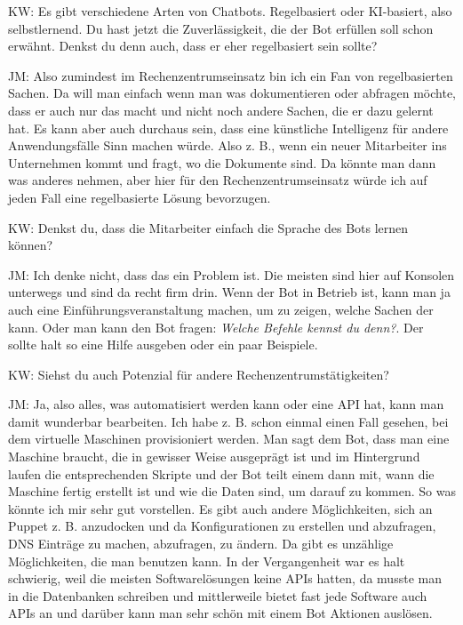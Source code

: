 \begin{list}{X:}{\setlength{\labelsep}{5mm}}
\item[KW:] Es gibt verschiedene Arten von Chatbots. Regelbasiert oder KI-basiert, also selbstlernend. Du hast jetzt die Zuverlässigkeit, die der Bot erfüllen soll schon erwähnt. Denkst du denn auch, dass er eher regelbasiert sein sollte?
\item[JM:] Also zumindest im Rechenzentrumseinsatz bin ich ein Fan von regelbasierten Sachen. Da will man einfach wenn man was dokumentieren oder abfragen möchte, dass er auch nur das macht und nicht noch andere Sachen, die er dazu gelernt hat. Es kann aber auch durchaus sein, dass eine künstliche Intelligenz für andere Anwendungsfälle Sinn machen würde. Also z. B., wenn ein neuer Mitarbeiter ins Unternehmen kommt und fragt, wo die Dokumente sind. Da könnte man dann was anderes nehmen, aber hier für den Rechenzentrumseinsatz würde ich auf jeden Fall eine regelbasierte Lösung bevorzugen.
\item[KW:] Denkst du, dass die Mitarbeiter einfach die Sprache des Bots lernen können?
\item[JM:] Ich denke nicht, dass das ein Problem ist. Die meisten sind hier auf Konsolen unterwegs und sind da recht firm drin. Wenn der Bot in Betrieb ist, kann man ja auch eine Einführungsveranstaltung machen, um zu zeigen, welche Sachen der kann. Oder man kann den Bot fragen: \textit{Welche Befehle kennst du denn?}. Der sollte halt so eine Hilfe ausgeben oder ein paar Beispiele.
\item[KW:] Siehst du auch Potenzial für andere Rechenzentrumstätigkeiten?
\item[JM:] Ja, also alles, was automatisiert werden kann oder eine API hat, kann man damit wunderbar bearbeiten. Ich habe z. B. schon einmal einen Fall gesehen, bei dem virtuelle Maschinen provisioniert werden. Man sagt dem Bot, dass man eine Maschine braucht, die in gewisser Weise ausgeprägt ist und im Hintergrund laufen die entsprechenden Skripte und der Bot teilt einem dann mit, wann die Maschine fertig erstellt ist und wie die Daten sind, um darauf zu kommen. So was könnte ich mir sehr gut vorstellen. Es gibt auch andere Möglichkeiten, sich an Puppet z. B. anzudocken und da Konfigurationen zu erstellen und abzufragen, DNS Einträge zu machen, abzufragen, zu ändern. Da gibt es unzählige Möglichkeiten, die man benutzen kann. In der Vergangenheit war es halt schwierig, weil die meisten Softwarelösungen keine APIs hatten, da musste man in die Datenbanken schreiben und mittlerweile bietet fast jede Software auch APIs an und darüber kann man sehr schön mit einem Bot Aktionen auslösen.

\end{list}
